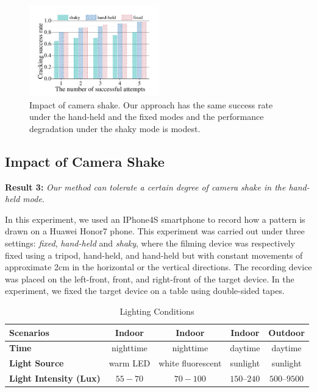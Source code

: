 \begin{figure}[!t]
    \centering
    \includegraphics[width=0.5\textwidth]{fig/14.pdf}
    \caption{Impact of camera shake. Our approach has the same success rate under the hand-held and the fixed modes and the performance degradation under the shaky mode is modest. }
    \label{fig:fig14}
\end{figure}


    \subsection{Impact of Camera Shake}

    \noindent \textbf{Result 3:} \emph{Our method can tolerate a certain degree of camera shake in the hand-held mode.}

    In this experiment, we used an IPhone4S smartphone to record how a pattern is drawn on a Huawei Honor7 phone. This experiment was carried out under three settings:
    \emph{fixed}, \emph{hand-held} and \emph{shaky}, where the filming
    device was respectively fixed using a tripod, hand-held, and hand-held but with constant movements of
     approximate 2cm in the horizontal or the vertical directions. The recording device was placed on the left-front, front, and right-front of the target device.
    In the experiment, we fixed the target device on a table using double-sided tapes.

      \begin{table}[!t]
            \centering
            \caption{Lighting Conditions}
            \label{tab:light}
            \scriptsize
            \begin{tabular}{lcccc}
                \toprule
                \textbf{Scenarios} & Indoor  & Indoor & Indoor  & Outdoor\\
                \midrule
                \textbf{Time} & nighttime &  nighttime & daytime & daytime \\
                \textbf{Light Source}& warm LED & white fluorescent & sunlight &  sunlight \\
                \textbf{Light Intensity (Lux)} & $55-70$ & $70-100$ & $150$--$240$ & $500$--$9500$ \\
                \bottomrule
            \end{tabular}
        \end{table}


